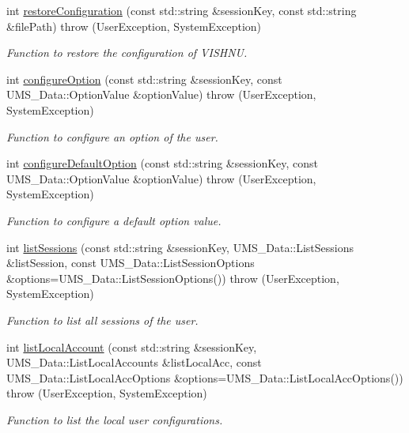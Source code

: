 \begin{DoxyCompactItemize}
int \hyperlink{namespacevishnu_a60ecb3b47532d0df7b0d44fdf43f98f4}{restoreConfiguration} (const std::string \&sessionKey, const std::string \&filePath)  throw (UserException, SystemException)
\begin{DoxyCompactList}\small\item\em Function to restore the configuration of VISHNU. \item\end{DoxyCompactList}\item 
int \hyperlink{namespacevishnu_a5b88fcd36b780df012b2529fe3526ca1}{configureOption} (const std::string \&sessionKey, const UMS\_\-Data::OptionValue \&optionValue)  throw (UserException, SystemException)
\begin{DoxyCompactList}\small\item\em Function to configure an option of the user. \item\end{DoxyCompactList}\item 
int \hyperlink{namespacevishnu_a05878cbc7dbb3f5da87dbc32dd25ab78}{configureDefaultOption} (const std::string \&sessionKey, const UMS\_\-Data::OptionValue \&optionValue)  throw (UserException, SystemException)
\begin{DoxyCompactList}\small\item\em Function to configure a default option value. \item\end{DoxyCompactList}\item 
int \hyperlink{namespacevishnu_adaf9c8ca47f577cf1a0c9effe7bd9c52}{listSessions} (const std::string \&sessionKey, UMS\_\-Data::ListSessions \&listSession, const UMS\_\-Data::ListSessionOptions \&options=UMS\_\-Data::ListSessionOptions())  throw (UserException, SystemException)
\begin{DoxyCompactList}\small\item\em Function to list all sessions of the user. \item\end{DoxyCompactList}\item 
int \hyperlink{namespacevishnu_a05618a81d403ef5c11e014fcecd7ba00}{listLocalAccount} (const std::string \&sessionKey, UMS\_\-Data::ListLocalAccounts \&listLocalAcc, const UMS\_\-Data::ListLocalAccOptions \&options=UMS\_\-Data::ListLocalAccOptions())  throw (UserException, SystemException)
\begin{DoxyCompactList}\small\item\em Function to list the local user configurations. \item\end{DoxyCompactList}\item 

\end{DoxyCompactItemize}
